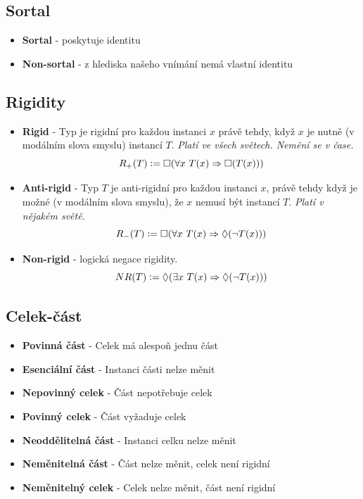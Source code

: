 \documentclass{szzclass}
\begin{document}
\subsection{Sortal}
\begin{itemize}
\item \textbf{Sortal} - poskytuje identitu
\item \textbf{Non-sortal} - z hlediska našeho vnímání nemá vlastní identitu
\end{itemize}

\subsection{Rigidity}
\begin{itemize}
\item \textbf{Rigid} - Typ je rigidní pro každou instanci $x$ právě tehdy, když $x$ je nutně (v modálním slova smyslu) instancí $T$. \textit{Platí ve všech světech. Nemění se v čase.} \\
  \[
    R_+(T) \vcentcolon= \square(\forall x~T(x) \Rightarrow \square(T(x)))
  \]
\item \textbf{Anti-rigid} - Typ $T$ je anti-rigidní pro každou instanci $x$, právě tehdy když je možné (v modálním slova smyslu), že $x$ nemusí být instancí $T$. \textit{Platí v nějakém světě.} \\
  \[
    R_-(T) \vcentcolon= \square(\forall x~T(x) \Rightarrow \Diamond(\neg T(x)))
  \]
\item \textbf{Non-rigid} - logická negace rigidity.
  \[
    NR(T) \vcentcolon= \Diamond(\exists x~T(x) \Rightarrow \Diamond(\neg T(x)))
  \]
\end{itemize}

\subsection{Celek-část}
\begin{itemize}
\item \textbf{Povinná část} - Celek má alespoň jednu část
\item \textbf{Esenciální část} - Instanci části nelze měnit
\item \textbf{Nepovinný celek} - Část nepotřebuje celek
\item \textbf{Povinný celek} - Část vyžaduje celek
\item \textbf{Neoddělitelná část} - Instanci celku nelze měnit
\item \textbf{Neměnitelná část} - Část nelze měnit, celek není rigidní
\item \textbf{Neměnitelný celek} - Celek nelze měnit, část není rigidní
\end{itemize}
\end{document}
